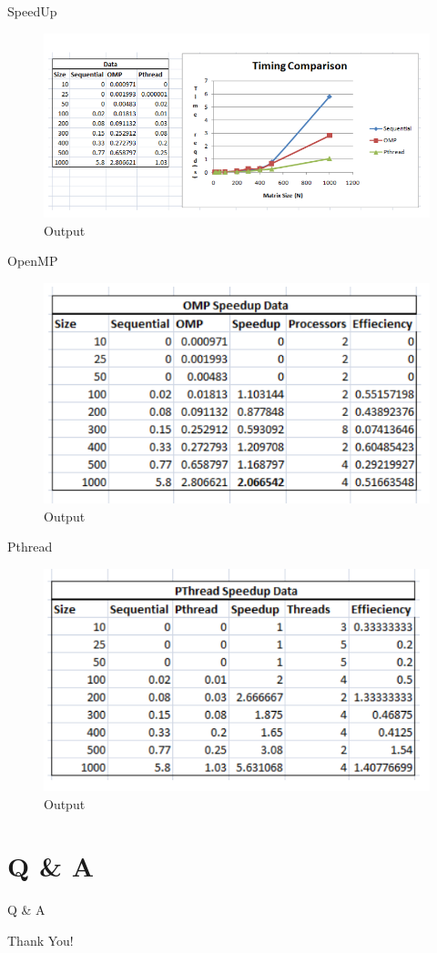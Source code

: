 \documentclass{beamer}
\begin{document}
\begin{frame}{SpeedUp}
\begin{center}
\begin{figure}[htp]
\centering
\includegraphics[scale=.4]{pic3.png}
\caption{Output}
\end{figure}
\end{center}
\end{frame}
\begin{frame}{OpenMP}
\begin{figure}[htp]
\centering
\includegraphics[scale=.4]{pic4.png}
\caption{Output}
\end{figure}
\end{frame}
\begin{frame}{Pthread}
\begin{figure}[htp]
\centering
\includegraphics[scale=.4]{pic5.png}
\caption{Output}
\end{figure}
\end{frame}

\section{Q \& A}
\begin{frame}{Q \& A}
\begin{center}
Thank You!
\end{center}
\end{frame}
\end{document}
